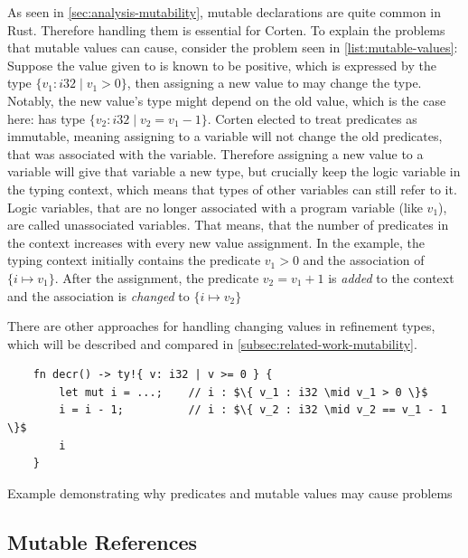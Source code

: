\documentclass[twoside, english]{sdqthesis}
\theoremstyle{definition}
\begin{document}
As seen in \cref{sec:analysis-mutability}, mutable declarations are quite common in Rust. Therefore handling them is essential for Corten.
To explain the problems that mutable values can cause, consider the problem seen in \cref{list:mutable-values}: Suppose the value given to  is known to be positive, which is expressed by the type $\{ v_1 : i32 \mid v_1 > 0\}$, then assigning a new value to  may change the type. Notably, the new value's type might depend on the old value, which is the case here:  has type $\{ v_2 : i32 \mid v_2 = v_1 - 1\}$.
Corten elected to treat predicates as immutable, meaning assigning to a variable will not change the old predicates, that was associated with the variable.
Therefore assigning a new value to a variable will give that variable a new type, but \- crucially \- keep the logic variable in the typing context, which means that types of other variables can still refer to it. Logic variables, that are no longer associated with a program variable (like $v_1$), are called unassociated variables.
That means, that the number of predicates in the context increases with every new value assignment.
In the example, the typing context initially contains the predicate $v_1 > 0$ and the association of $\{i \mapsto v_1\}$. After the assignment, the predicate $v_2 = v_1 + 1$ is \textit{added} to the context and the association is \textit{changed} to $\{i \mapsto v_2\}$

There are other approaches for handling changing values in refinement types, which will be described and compared in \ref{subsec:related-work-mutability}.


\begin{listing}[ht]
  \begin{verbatim}
    fn decr() -> ty!{ v: i32 | v >= 0 } {
        let mut i = ...;    // i : $\{ v_1 : i32 \mid v_1 > 0 \}$
        i = i - 1;          // i : $\{ v_2 : i32 \mid v_2 == v_1 - 1 \}$
        i
    }
  \end{verbatim}
  \caption{Example demonstrating why predicates and mutable values may cause problems}
  \label{lst:mutable-values}
\end{listing}

\label{subsec:mutable-references}\subsection{Mutable References}
\end{document}
